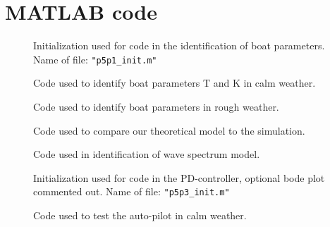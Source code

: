 \appendix

\section{MATLAB code}\label{sec:MATLAB}

\begin{figure}[!htb]
    \centering
    \caption{Initialization used for code in the identification of boat parameters. Name of file: \texttt{"p5p1\_init.m"}}
    
    \label{fig:p5p1_init}
\end{figure}

\begin{figure}[!htb]
    \centering
    \caption{Code used to identify boat parameters T and K in calm weather.}
    
    \label{fig:p5p1b}
\end{figure}

\begin{figure}[!htb]
    \centering
    \caption{Code used to identify boat parameters in rough weather.}
    
    \label{fig:p5p1c}
\end{figure}

\begin{figure}[!htb]
    \centering
    \caption{Code used to compare our theoretical model to the simulation.}
    
    \label{fig:p5p1d}
\end{figure}


\begin{figure}[!htb]
    \centering
    \caption{Code used in identification of wave spectrum model. }
    
    \label{fig:p5p2}
\end{figure}

\begin{figure}[!htb]
    \centering
    \caption{Initialization used for code in the PD-controller, optional bode plot commented out. Name of file: \texttt{"p5p3\_init.m"}}
    
    \label{fig:p5p3_init}
\end{figure}

\begin{figure}[!htb]
    \centering
    \caption{Code used to test the auto-pilot in calm weather.}
    
    \label{fig:p5p3d}
\end{figure}

